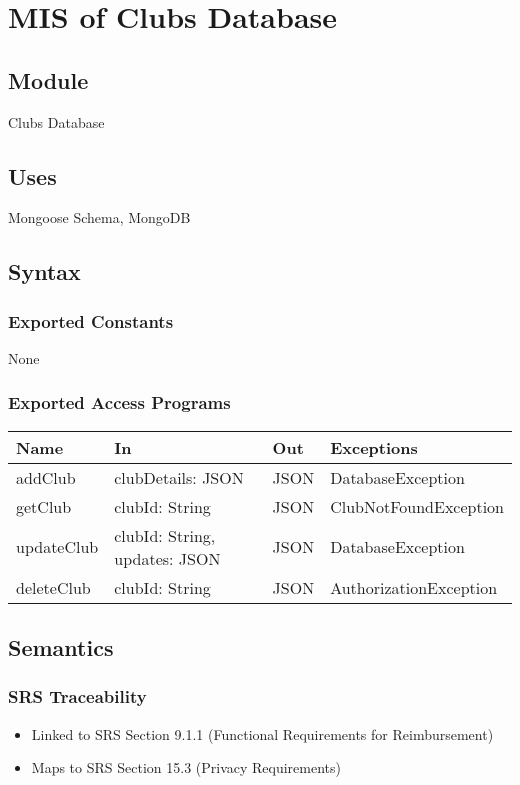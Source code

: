 \documentclass[12pt, titlepage]{article}
\begin{document}
\section{MIS of Clubs Database} \label{Clubs Database}

\subsection{Module}
Clubs Database

\subsection{Uses}
Mongoose Schema, MongoDB

\subsection{Syntax}

\subsubsection{Exported Constants}
None

\subsubsection{Exported Access Programs}

\begin{center}
\begin{tabular}{p{2cm} p{4cm} p{2cm} p{4cm}}
\hline
\textbf{Name} & \textbf{In} & \textbf{Out} & \textbf{Exceptions} \\
\hline
addClub & clubDetails: JSON & JSON & DatabaseException \\
getClub & clubId: String & JSON & ClubNotFoundException \\
updateClub & clubId: String, updates: JSON & JSON & DatabaseException \\
deleteClub & clubId: String & JSON & AuthorizationException \\
\hline
\end{tabular}
\end{center}

\subsection{Semantics}

\subsubsection{SRS Traceability}
\begin{itemize}
  \item Linked to SRS Section 9.1.1 (Functional Requirements for Reimbursement)
  \item Maps to SRS Section 15.3 (Privacy Requirements)
\end{itemize}
\end{document}
